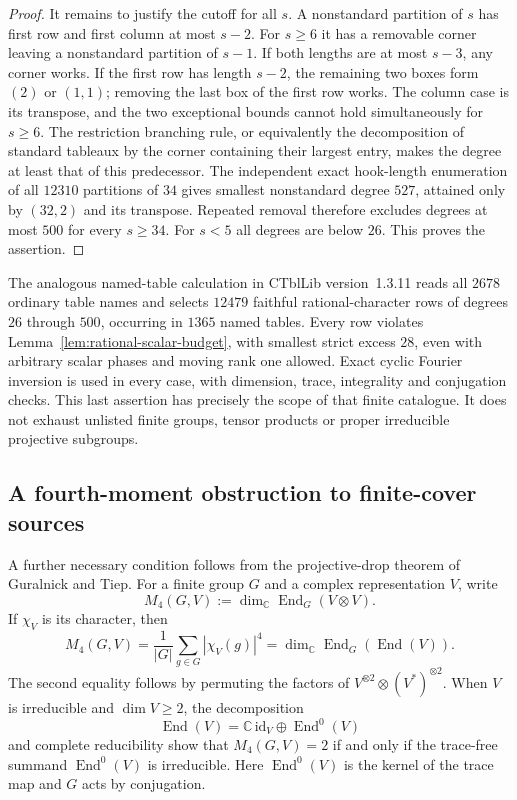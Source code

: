 \documentclass[11pt]{article}
\theoremstyle{definition}
\theoremstyle{remark}
\begin{document}
\begin{proof}
It remains to justify the cutoff for all $s$.  A nonstandard
partition of $s$ has first row and first column at most $s-2$.
For $s\ge6$ it has a removable corner leaving a nonstandard
partition of $s-1$.  If both lengths are at most $s-3$, any
corner works.  If the first row has length $s-2$, the remaining
two boxes form $(2)$ or $(1,1)$; removing the last box of the
first row works.  The column case is its transpose, and the two
exceptional bounds cannot hold simultaneously for $s\ge6$.
The restriction branching rule, or equivalently the decomposition
of standard tableaux by the corner containing their largest entry,
makes the degree at least that of this predecessor.
The independent exact hook-length enumeration of all $12310$
partitions of $34$ gives smallest nonstandard degree $527$,
attained only by $(32,2)$ and its transpose.  Repeated removal
therefore excludes degrees at most $500$ for every $s\ge34$.
For $s<5$ all degrees are below $26$.  This proves the assertion.
\end{proof}

The analogous named-table calculation in CTblLib version~1.3.11
reads all $2678$ ordinary table names and selects $12479$ faithful
rational-character rows of degrees $26$ through $500$, occurring
in $1365$ named tables.  Every row violates
Lemma~\ref{lem:rational-scalar-budget}, with smallest strict
excess $28$, even with arbitrary scalar phases and moving rank
one allowed.  Exact cyclic Fourier inversion is used in every
case, with dimension, trace, integrality and conjugation checks.
This last assertion has precisely the scope of that finite
catalogue.  It does not exhaust unlisted finite groups, tensor
products or proper irreducible projective subgroups.
\subsection{A fourth-moment obstruction to finite-cover sources}

A further necessary condition follows from the projective-drop theorem of
Guralnick and Tiep.  For a finite group $G$ and a complex representation $V$,
write
\[
 M_4(G,V):=\dim_{\mathbb C}\operatorname{End}_G(V\otimes V).
\]
If $\chi_V$ is its character, then
\[
 M_4(G,V)=\frac1{|G|}\sum_{g\in G}|\chi_V(g)|^4
 =\dim_{\mathbb C}\operatorname{End}_G(\operatorname{End}(V)).
\]
The second equality follows by permuting the factors of
$V^{\otimes2}\otimes(V^*)^{\otimes2}$.  When $V$ is irreducible and
$\dim V\ge2$, the decomposition
\[
 \operatorname{End}(V)=\mathbb C\,\mathrm{id}_V
 \oplus\operatorname{End}^{0}(V)
\]
and complete reducibility show that $M_4(G,V)=2$ if and only if the
trace-free summand $\operatorname{End}^{0}(V)$ is irreducible.
Here $\operatorname{End}^{0}(V)$ is the kernel of the trace map and $G$
acts by conjugation.
\end{document}
